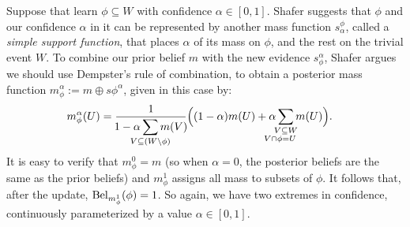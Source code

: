 \documentclass{uai2023}
\theoremstyle{plain}
\theoremstyle{definition}
\begin{document}
\begin{example}
Suppose that learn $\phi 
\subseteq W$ with confidence $\alpha \in [0,1]$.  
Shafer suggests that $\phi$ and our confidence $\alpha$ in it
can be represented by another mass function $s^\phi_\alpha$,
called a \emph{simple support function},
that places $\alpha$ of its mass on $\phi$, and the rest on the trivial event $W$.
To combine our prior belief $m$ with the new evidence $s_\phi^\alpha$,
Shafer argues we should use Dempster's rule of combination,
to obtain a posterior mass function $m_\phi^\alpha := m \oplus
s\phi^\alpha$,  
given in this case by:
\begin{align*}
    m_\phi^\alpha(U) &= 
\frac{1}{\!\displaystyle 1 - \alpha \sum_{\mathclap{V \subseteq (W \setminus \phi)}} m(V)\!}
	\Big(
	(1-\alpha) m(U) + 
	\alpha \sum_{\substack{\mathclap{V \subseteq W} \\ \mathllap{V \cap \phi} = \mathrlap{U}}} m(U) 
		\Big).
\end{align*}
It is easy to verify that
$m_\phi^0 = m$ (so when $\alpha = 0$, the posterior beliefs are the
same as the prior beliefs) and $m_\phi^1$ 
assigns all mass to subsets of $\phi$.
It follows that, after the update, $\mathrm{Bel}_{m_\phi^1}(\phi) = 1$.
So again, we have two extremes in confidence, continuously parameterized
by a value $\alpha \in [0,1]$.



\end{example}
\end{document}

